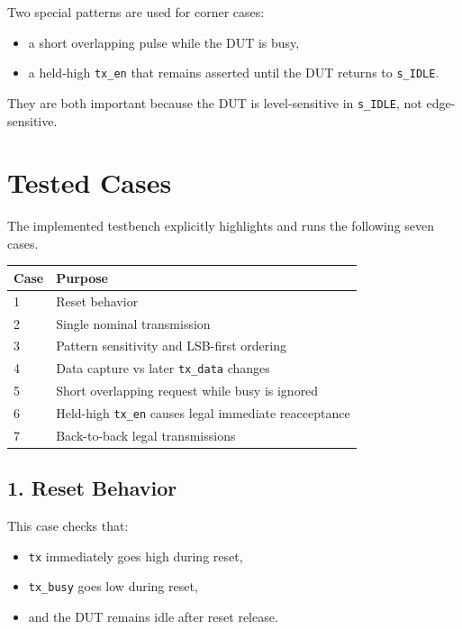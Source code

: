 \documentclass[12pt]{article}
\begin{document}
Two special patterns are used for corner cases:

\begin{itemize}
    \item a short overlapping pulse while the DUT is busy,
    \item a held-high \texttt{tx\_en} that remains asserted until the DUT returns to \texttt{s\_IDLE}.
\end{itemize}

They are both important because the DUT is level-sensitive in \texttt{s\_IDLE},
not edge-sensitive.

\section{Tested Cases}

The implemented testbench explicitly highlights and runs the following seven
cases.

\begin{center}
\begin{tabular}{@{}ll@{}}
\toprule
\textbf{Case} & \textbf{Purpose} \\
\midrule
1 & Reset behavior \\
2 & Single nominal transmission \\
3 & Pattern sensitivity and LSB-first ordering \\
4 & Data capture vs later \texttt{tx\_data} changes \\
5 & Short overlapping request while busy is ignored \\
6 & Held-high \texttt{tx\_en} causes legal immediate reacceptance \\
7 & Back-to-back legal transmissions \\
\bottomrule
\end{tabular}
\end{center}

\subsection*{1. Reset Behavior}

This case checks that:

\begin{itemize}
    \item \texttt{tx} immediately goes high during reset,
    \item \texttt{tx\_busy} goes low during reset,
    \item and the DUT remains idle after reset release.
\end{itemize}
\end{document}
